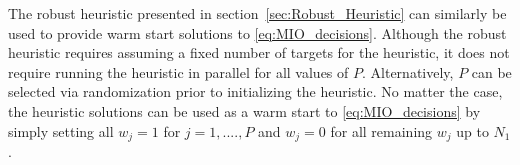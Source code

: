 The robust heuristic presented in section~\ref{sec:Robust_Heuristic} can similarly be used to provide warm start solutions to \eqref{eq:MIO_decisions}. Although the robust heuristic requires assuming a fixed number of targets for the heuristic, it does not require running the heuristic in parallel for all values of $P$. Alternatively, $P$ can be selected via randomization prior to initializing the heuristic. No matter the case, the heuristic solutions can be used as a warm start to \eqref{eq:MIO_decisions} by simply setting all $w_{j}=1$ for $j=1,....,P$ and $w_{j}=0$ for all remaining $w_{j}$ up to $N_{1}$.